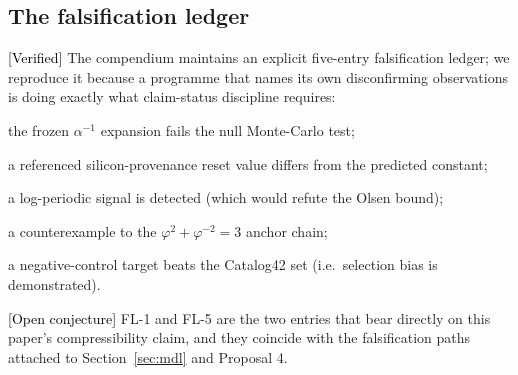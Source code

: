 \documentclass[11pt]{article}
\newcommand{\Verified}{\textcolor{black}{[Verified]}}
\newcommand{\Conj}{\textcolor{black}{[Open conjecture]}}
\newcommand{\phigr}{\varphi}
\begin{document}
\subsection{The falsification ledger}\label{sec:ledger}
\Verified{} The compendium maintains an explicit five-entry falsification ledger; we reproduce it because a programme that names its own disconfirming observations is doing exactly what claim-status discipline requires:
\begin{description}[leftmargin=*]
\item[FL-1] the frozen $\alpha^{-1}$ expansion fails the null Monte-Carlo test;
\item[FL-2] a referenced silicon-provenance reset value differs from the predicted constant;
\item[FL-3] a log-periodic signal is detected (which would refute the Olsen bound);
\item[FL-4] a counterexample to the $\phigr^2 + \phigr^{-2} = 3$ anchor chain;
\item[FL-5] a negative-control target beats the Catalog42 set (i.e.\ selection bias is demonstrated).
\end{description}
\Conj{} FL-1 and FL-5 are the two entries that bear directly on this paper's compressibility claim, and they coincide with the falsification paths attached to Section~\ref{sec:mdl} and Proposal 4.
\end{document}
